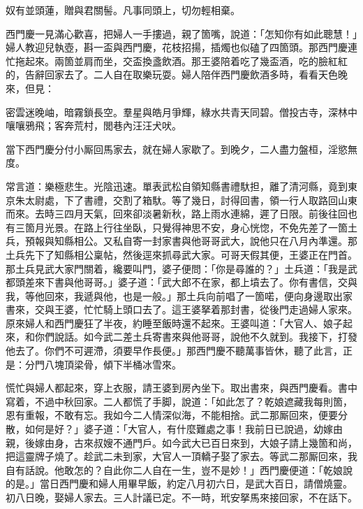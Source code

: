 \begin{myquote} 
奴有並頭蓮，贈與君關髻。凡事同頭上，切勿輕相棄。
\end{myquote} 

西門慶一見滿心歡喜，把婦人一手摟過，親了箇嘴，說道：「怎知你有如此聰慧！」{}婦人教迎兒執壺，斟一盃與西門慶，花枝招揚，插燭也似磕了四箇頭。那西門慶連忙拖起來。兩箇並肩而坐，交盃換盞飲酒。那王婆陪着吃了幾盃酒，吃的臉紅紅的，告辭回家去了。二人自在取樂玩耍。婦人陪伴西門慶飲酒多時，看看天色晚來，但見：

\begin{myquote} 
密雲迷晚岫，暗霧鎖長空。羣星與皓月爭輝，綠水共青天同碧。僧投古寺，深林中嚷嚷鴉飛；客奔荒村，閭巷內汪汪犬吠。
\end{myquote} 

當下西門慶分付小厮回馬家去，就在婦人家歇了。到晚夕，二人盡力盤桓，淫慾無度。

常言道：樂極悲生。光陰迅速。單表武松自領知縣書禮馱担，離了清河縣，竟到東京朱太尉處，下了書禮，交割了箱馱。等了幾日，討得回書，領一行人取路回山東而來。去時三四月天氣，回來卻淡暑新秋，路上雨水連綿，遲了日限。前後往回也有三箇月光景。在路上行往坐臥，只覺得神思不安，身心恍惚，{}不免先差了一箇土兵，預報與知縣相公。又私自寄一封家書與他哥哥武大，說他只在八月內準還。那土兵先下了知縣相公稟帖，然後逕來抓尋武大家。可哥天假其便，王婆正在門首。那土兵見武大家門關着，纔要叫門，婆子便問：「你是尋誰的？」土兵道：「我是武都頭差來下書與他哥哥。」婆子道：「武大郎不在家，都上墳去了。你有書信，交與我，等他回來，我遞與他，也是一般。」那土兵向前唱了一箇喏，便向身邊取出家書來，交與王婆，忙忙騎上頭口去了。這王婆拏着那封書，從後門走過婦人家來。原來婦人和西門慶狂了半夜，約睡至飯時還不起來。王婆叫道：「大官人、娘子起來，和你們說話。如今武二差土兵寄書來與他哥哥，說他不久就到。我接下，打發他去了。你們不可遲滯，須要早作長便。」那西門慶不聽萬事皆休，聽了此言，正是：分門八塊頂梁骨，傾下半桶冰雪來。

慌忙與婦人都起來，穿上衣服，請王婆到房內坐下。取出書來，與西門慶看。書中寫着，不過中秋回家。二人都慌了手脚，說道：「如此怎了？乾娘遮藏我每則箇，恩有重報，不敢有忘。我如今二人情深似海，不能相捨。武二那厮回來，便要分散，如何是好？」婆子道：「大官人，有什麼難處之事！我前日已說過，幼嫁由親，後嫁由身，古來叔嫂不通門戶。如今武大已百日來到，大娘子請上幾箇和尚，把這靈牌子燒了。趁武二未到家，大官人一頂轎子娶了家去。等武二那厮回來，我自有話說。他敢怎的？自此你二人自在一生，豈不是妙！」西門慶便道：「乾娘說的是。」當日西門慶和婦人用畢早飯，約定八月初六日，是武大百日，請僧燒靈。初八日晚，娶婦人家去。三人計議已定。不一時，玳安拏馬來接回家，不在話下。

